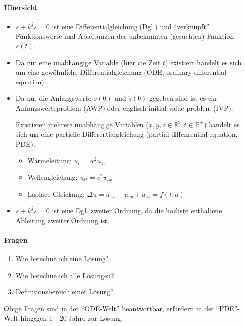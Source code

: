 
\paragraph{Übersicht}

\begin{itemize}
	\item $\ddot s + k^2s = 0$ ist eine Differentialgleichung (Dgl.) und "`verknüpft"' Funktionswerte und Ableitungen der unbekannten (gesuchten) Funktion $s(t)$.
	\item Da nur eine unabhängige Variable (hier die Zeit $t$) existiert handelt es sich um eine gewöhnliche Differentialgleichung (ODE, ordinary differential equation).
	\item Da nur die Anfangswerte $s(0)$ und $\dot s(0)$ gegeben sind ist es ein Anfangswerteproblem (AWP) oder englisch initial value problem (IVP).
	\begin{note}
		Existieren mehrere unabhängige Variablen ($x, y, z \in \mathbb{R}^3, t \in \mathbb{R}^+$) handelt es sich um eine partielle Differentialgleichung (partial diffenrential equation, PDE).
		\begin{example}
			\begin{itemize}
				\item Wärmeleitung: $u_t = \alpha^2 u_{xx}$
				\item Wellengleichung: $u_{tt} = c^2 u_{xx}$
				\item Laplace-Gleichung: $\Delta u = u_{xx} + u_{yy} + u_{zz} = f(t, u)$
			\end{itemize}
		\end{example}
	\end{note}
	\item $\ddot s + k^2s = 0$ ist eine Dgl. zweiter Ordnung, da die höchste enthaltene Ableitung zweiter Ordnung ist.
\end{itemize}

\paragraph{Fragen}
\begin{enumerate}
	\item Wie berechne ich \underline{eine} Lösung?
	\item Wie berechne ich \underline{alle} Lösungen?
	\item Definitionsbereich einer Lösung?
\end{enumerate}
Obige Fragen sind in der "`ODE-Welt"' beantwortbar, erfordern in der "`PDE"'-Welt hingegen 1 - 20 Jahre zur Lösung.

